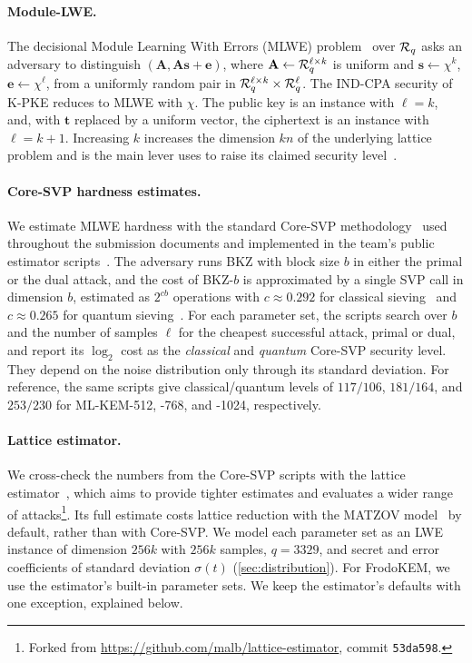 \paragraph{Module-LWE.} The decisional Module Learning With Errors (MLWE) problem~\cite{DCC:LanSte15} over $\mathcal{R}_q$ asks an adversary
to distinguish $(\mathbf{A}, \mathbf{A}\mathbf{s}+\mathbf{e})$, where $\mathbf{A}\leftarrow \mathcal{R}_q^{\ell\times k}$ is uniform and
$\mathbf{s}\leftarrow \chi^k$, $\mathbf{e}\leftarrow \chi^\ell$, from a uniformly random pair in $\mathcal{R}_q^{\ell\times k}\times \mathcal{R}_q^\ell$.
The IND-CPA security of K-PKE reduces to MLWE with $\chi$. The public key is an instance with $\ell=k$, and, with $\mathbf{t}$ replaced
by a uniform vector, the ciphertext is an instance with $\ell=k+1$. Increasing $k$ increases the dimension $kn$ of the underlying lattice
problem and is the main lever \kyber uses to raise its claimed security level~\cite{kyberround1}.

\paragraph{Core-SVP hardness estimates.} We estimate MLWE hardness with the standard Core-SVP methodology~\cite{USENIX:ADPS16}
used throughout the \kyber submission documents and implemented in the \kyber team's public estimator
scripts~\cite{kyber-scripts}. The adversary runs BKZ with block size $b$ in either the primal or the dual attack, and the cost of
BKZ-$b$ is approximated by a single SVP call in dimension $b$, estimated as $2^{cb}$ operations with $c\approx 0.292$ for classical
sieving~\cite{SODA:BDGL16} and $c\approx 0.265$ for quantum sieving~\cite{laarhoven-thesis}. For each parameter set, the scripts
search over $b$ and the number of samples $\ell$ for the cheapest successful attack, primal or dual, and report its $\log_2$ cost as
the \emph{classical} and \emph{quantum} Core-SVP security level. They depend on the noise distribution only through its standard
deviation. For reference, the same scripts give classical/quantum levels of $117/106$, $181/164$, and $253/230$ for ML-KEM-512,
-768, and -1024, respectively.

\paragraph{Lattice estimator.} We cross-check the numbers from the \kyber Core-SVP scripts with the lattice estimator~\cite{estimator}, which aims to
provide tighter estimates and evaluates a wider range of attacks\footnote{Forked from
\url{https://github.com/malb/lattice-estimator}, commit \texttt{53da598}.}. Its
full estimate costs lattice reduction with the MATZOV model~\cite{matzov2022lwe} by default, rather than with Core-SVP.
We model each \kaiburr parameter set as an LWE instance of dimension $256k$ with $256k$ samples, $q=3329$, and secret and error
coefficients of standard deviation $\sigma(t)$ (\cref{sec:distribution}). For FrodoKEM, we use the estimator's built-in
parameter sets. We keep the estimator's defaults with one exception, explained below.

